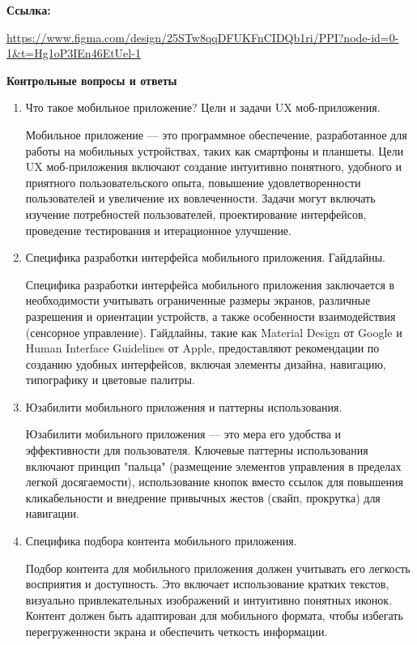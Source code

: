 \textbf{Ссылка:}

\url{https://www.figma.com/design/25STw8qqDFUKFnCIDQb1ri/PPI?node-id=0-1&t=Hg1oP3IEn46EtUel-1}
\bigskip
\bigskip

\textbf{Контрольные вопросы и ответы}

\begin{enumerate}
    \item Что такое мобильное приложение? Цели и задачи UX моб-приложения.

    Мобильное приложение — это программное обеспечение, разработанное для работы на мобильных устройствах, таких как смартфоны и планшеты. Цели UX моб-приложения включают создание интуитивно понятного, удобного и приятного пользовательского опыта, повышение удовлетворенности пользователей и увеличение их вовлеченности. Задачи могут включать изучение потребностей пользователей, проектирование интерфейсов, проведение тестирования и итерационное улучшение.

    \item Специфика разработки интерфейса мобильного приложения. Гайдлайны.

    Специфика разработки интерфейса мобильного приложения заключается в необходимости учитывать ограниченные размеры экранов, различные разрешения и ориентации устройств, а также особенности взаимодействия (сенсорное управление). Гайдлайны, такие как Material Design от Google и Human Interface Guidelines от Apple, предоставляют рекомендации по созданию удобных интерфейсов, включая элементы дизайна, навигацию, типографику и цветовые палитры.

    \item Юзабилити мобильного приложения и паттерны использования.

    Юзабилити мобильного приложения — это мера его удобства и эффективности для пользователя. Ключевые паттерны использования включают принцип "пальца" (размещение элементов управления в пределах легкой досягаемости), использование кнопок вместо ссылок для повышения кликабельности и внедрение привычных жестов (свайп, прокрутка) для навигации.

    \item Специфика подбора контента мобильного приложения.

    Подбор контента для мобильного приложения должен учитывать его легкость восприятия и доступность. Это включает использование кратких текстов, визуально привлекательных изображений и интуитивно понятных иконок. Контент должен быть адаптирован для мобильного формата, чтобы избегать перегруженности экрана и обеспечить четкость информации.


\end{enumerate}
